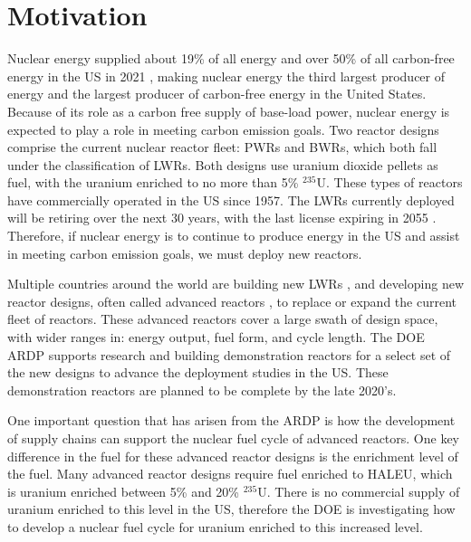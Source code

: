 \section{Motivation}
Nuclear energy supplied about 19\% of all energy and over 50\%  
of all carbon-free energy in the US in 2021 
\cite{energy_information_administration_electricity_2022}, making nuclear 
energy the third largest producer of energy and the largest 
producer of carbon-free energy in the United States. Because of its role 
as a carbon free supply of base-load power, nuclear energy is expected 
to play a role in meeting carbon emission goals. Two reactor designs 
comprise the current nuclear reactor fleet: \glspl{PWR} and \glspl{BWR}, 
which both fall under the classification of \glspl{LWR}.
Both designs use uranium dioxide pellets as fuel, with the uranium 
enriched to no more than 5\% $^{235}$U. These types of reactors 
have commercially operated in the US since 1957. The \glspl{LWR} 
currently deployed will be retiring over the next 30 years, with the 
last license expiring in 2055 \cite{nei_us_2021}. Therefore, if 
nuclear energy is to continue to produce energy in the US 
and assist in meeting carbon emission goals, we must deploy new reactors. 

Multiple countries around the world are building new \glspl{LWR}
\cite{world_nuclear_association_plans_2022}, and developing
new reactor designs, often called advanced reactors 
\cite{hussain_advances_2018}, to 
replace or expand the current fleet of reactors. These advanced reactors 
cover a large swath of design space, with wider ranges in: energy output, 
fuel form, and cycle length. The 
\gls{DOE} \gls{ARDP} \cite{noauthor_advanced_nodate}
supports research and building demonstration reactors for a select set of 
the new designs to advance the deployment studies in the US. These 
demonstration reactors are planned to be complete by the late 2020's.

One important question that has arisen from the \gls{ARDP} is how the 
development of supply chains can support the nuclear fuel cycle of 
advanced reactors. 
One key difference in the fuel for these advanced 
reactor designs is the enrichment 
level of the fuel. Many advanced reactor designs require fuel enriched to 
\acrfull{HALEU}, which is uranium enriched between 5\% and 20\% $^{235}$U.
There is no commercial supply of 
uranium enriched to this level in the US, therefore the \gls{DOE} 
is investigating how to develop a nuclear fuel cycle for uranium enriched to this 
increased level. 

